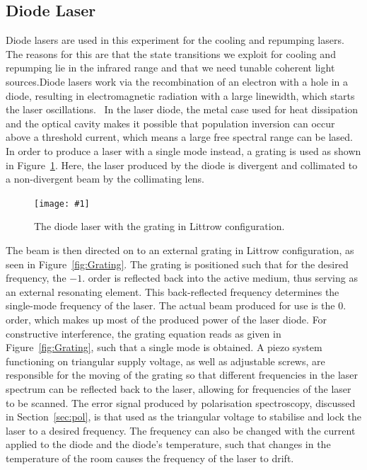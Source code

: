 \documentclass[twocolumn]{article}
\newcommand{\insertFigure}[1]{%
   \texttt{[image: \#1]}%
}
\begin{document}
\subsection{Diode Laser} \label{sec:laser}
Diode lasers are used in this experiment for the cooling and repumping lasers. The reasons for this are that the state transitions we exploit for cooling and repumping lie in the infrared range and that we need tunable coherent light sources.Diode lasers work via the recombination of an electron with a hole in a diode, resulting in electromagnetic radiation with a large linewidth, which starts the laser oscillations.~\cite{demtroder} In the laser diode, the metal case used for heat dissipation and the optical cavity makes it possible that population inversion can occur above a threshold current, which means a large free spectral range can be lased. In order to produce a laser with a single mode instead, a grating is used as shown in Figure~\ref{fig:Diode}. Here, the laser produced by the diode is divergent and collimated to a non-divergent beam by the collimating lens.
\begin{figure} [!h]
	\centering
	\insertFigure{Images/Diode.png}
	\caption{The diode laser with the grating in Littrow configuration.\cite{manual}}
	\label{fig:Diode}
\end{figure}
The beam is then directed on to an external grating in Littrow configuration, as seen in Figure~\ref{fig:Grating}. The grating is positioned such that for the desired frequency, the $-1.$ order is reflected back into the active medium, thus serving as an external resonating element. This back-reflected frequency determines the single-mode frequency of the laser. The actual beam produced for use is the $0.$ order, which makes up most of the produced power of the laser diode. For constructive interference, the grating equation reads as given in Figure~\ref{fig:Grating}, such that a single mode is obtained. A piezo system functioning on triangular supply voltage, as well as adjustable screws, are responsible for the moving of the grating so that different frequencies in the laser spectrum can be reflected back to the laser, allowing for frequencies of the laser to be scanned. The error signal produced by polarisation spectroscopy, discussed in Section~\ref{sec:pol}, is that used as the triangular voltage to stabilise and lock the laser to a desired frequency. The frequency can also be changed with the current applied to the diode and the diode's temperature, such that changes in the temperature of the room causes the frequency of the laser to drift.
\end{document}
